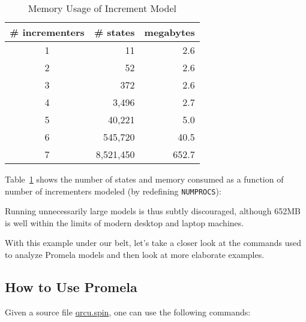 \begin{table}
\begin{center}
\begin{tabular}{c|r|r}
	\# incrementers & \# states &	megabytes \\
	\hline
	\hline
	1 &		        11 &          2.6 \\
	\hline
	2 &		        52 &          2.6 \\
	\hline
	3 &		       372 &          2.6 \\
	\hline
	4 &		     3,496 &          2.7 \\
	\hline
	5 &		    40,221 &          5.0 \\
	\hline
	6 &		   545,720 &         40.5 \\
	\hline
	7 &		 8,521,450 &        652.7 \\
\end{tabular}
\end{center}
\caption{Memory Usage of Increment Model}
\label{tab:advsync:Memory Usage of Increment Model}
\end{table}

Table~\ref{tab:advsync:Memory Usage of Increment Model}
shows the number of states and memory consumed
as a function of number of incrementers modeled
(by redefining {\tt NUMPROCS}):

Running unnecessarily large models is thus subtly discouraged, although
652MB is well within the limits of modern desktop and laptop machines.

With this example under our belt, let's take a closer look at the
commands used to analyze Promela models and then look at more
elaborate examples.

\subsection{How to Use Promela}
\label{sec:formal:How to Use Promela}

Given a source file \url{qrcu.spin}, one can use the following commands:

